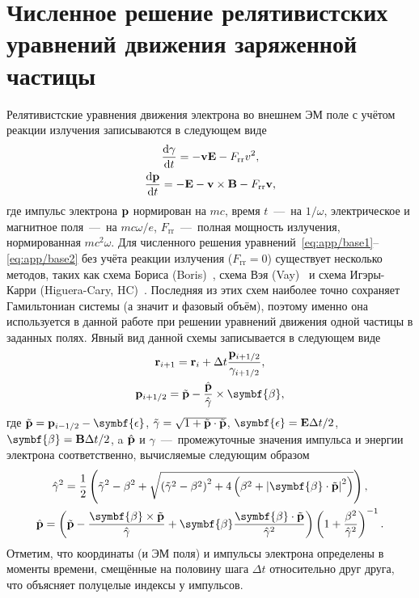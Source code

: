 \chapter{Численное решение релятивистских уравнений движения заряженной частицы}
\label{app:numerical}

Релятивистские уравнения движения электрона во внешнем ЭМ поле с учётом реакции излучения записываются в следующем виде
\begin{gather}
    \label{eq:app/base1}
    \dv{\gamma}{t} = -\vb{vE} - F_\mathrm{rr} v^2 , \\
    \label{eq:app/base2}
    \dv{\vb{p}}{t} = - \vb{E - v\times B} - F_\mathrm{rr}\vb{v},
\end{gather}
где импульс электрона $\vb{p}$ нормирован на $m c$, время $t$~---~на $1/\omega$, электрическое и магнитное поля~---~на $m c \omega / e$, $F_\mathrm{rr}$~---~полная мощность излучения, нормированная $mc^2\omega$.
Для численного решения уравнений~\eqref{eq:app/base1}--\eqref{eq:app/base2} без учёта реакции излучения ($F_\mathrm{rr}=0$) существует несколько методов, таких как схема Бориса (Boris)~\cite{boris1970relativistic}, схема Вэя (Vay)~\cite{Vay08} и схема Игэры-Карри (Higuera-Cary, HC)~\cite{higuera2017structure}. 
Последняя из этих схем наиболее точно сохраняет Гамильтониан системы (а значит и фазовый объём), поэтому именно она используется в данной работе при решении уравнений движения одной частицы в заданных полях.
Явный вид данной схемы записывается в следующем виде
\begin{gather}
    \vb{r}_{i+1} = \vb{r}_i + \Delta t \frac{\vb{p}_{i+1/2}}{\gamma_{i+1/2}}, \\
    \vb{p}_{i+1/2} = \tilde{\vb{p}} - \frac{\hat{\vb{p}} }{\hat{\gamma}} \times \symbf{\beta},
\end{gather}
где $\tilde{\vb{p}} = \vb{p}_{i-1/2} - \symbf{\epsilon}$, $\tilde{\gamma} = \sqrt{1 + \tilde{\vb{p}}\cdot\tilde{\vb{p}}}$, $\symbf{\epsilon} = \vb{E}\Delta t / 2$, $\symbf{\beta} = \vb{B} \Delta t / 2$, a $\hat{\vb{p}}$ и $\hat{\gamma}$~---~промежуточные значения импульса и энергии электрона соответственно, вычисляемые следующим образом
\begin{gather}
    \hat{\gamma}^2 = \frac{1}{2}\left( \tilde{\gamma}^2 - \beta^2 + \sqrt{\left( \tilde{\gamma}^2 - \beta^2 \right)^2 + 4 \left( \beta^2 + {\left|\symbf{\beta}\cdot\tilde{\vb{p}}\right|}^2 \right)} \right), \\
    \hat{\vb{p}} = \left( \tilde{\vb{p}} - \frac{\symbf{\beta} \times \tilde{\vb{p}}}{\hat{\gamma}} + \symbf{\beta} \frac{\symbf{\beta}\cdot\tilde{\vb{p}}}{\hat{\gamma}^2} \right) \left( 1 + \frac{\beta^2}{\hat{\gamma}^2} \right)^{-1}.
\end{gather}
Отметим, что координаты (и ЭМ поля) и импульсы электрона определены в моменты времени, смещённые на половину шага $\Delta t$ относительно друг друга, что объясняет полуцелые индексы у импульсов.

